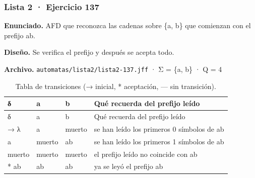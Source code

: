 
\hypertarget{lista-2-ejercicio-137}{%
\subsubsection{Lista 2 · Ejercicio 137}\label{lista-2-ejercicio-137}}

\textbf{Enunciado.} AFD que reconozca las cadenas sobre \{a, b\} que comienzan con el prefijo ab.

\textbf{Diseño.} Se verifica el prefijo y después se acepta todo.

\textbf{Archivo.} \texttt{automatas/lista2/lista2-137.jff} · Σ = \{a, b\} · \textbar Q\textbar{} = 4

\begin{longtable}[]{@{}llll@{}}
\caption{Tabla de transiciones (→ inicial, * aceptación, --- sin transición).}\tabularnewline
\toprule\noalign{}
δ & a & b & Qué recuerda del prefijo leído \\
\midrule\noalign{}
\endfirsthead
\toprule\noalign{}
δ & a & b & Qué recuerda del prefijo leído \\
\midrule\noalign{}
\endhead
\bottomrule\noalign{}
\endlastfoot
→ λ & a & muerto & se han leído los primeros 0 símbolos de ab \\
a & muerto & ab & se han leído los primeros 1 símbolos de ab \\
muerto & muerto & muerto & el prefijo leído no coincide con ab \\
* ab & ab & ab & ya se leyó el prefijo ab \\
\end{longtable}

